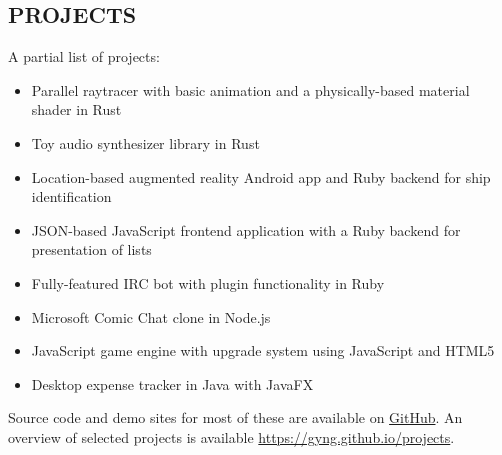 \documentclass[line, margin]{res}
\begin{document}
\begin{resume}
    \section{PROJECTS}
        A partial list of projects: \\
        \begin{itemize}[leftmargin=*]
        \item Parallel raytracer with basic animation and a physically-based material shader in Rust
        \item Toy audio synthesizer library in Rust
        \item Location-based augmented reality Android app and Ruby backend for ship identification
        \item \textsc{JSON}-based JavaScript frontend application with a Ruby backend for presentation of lists
        \item \textsc Fully-featured IRC bot with plugin functionality in Ruby
        \item Microsoft Comic Chat clone in Node.js
        \item JavaScript game engine with upgrade system using JavaScript and HTML5
        \item Desktop expense tracker in Java with JavaFX
        \end{itemize}

        Source code and demo sites for most of these are available on \href{http://github.com/gyng}{GitHub}. An overview of selected projects is available \href{https://gyng.github.io/projects}{https://gyng.github.io/projects}.

\end{resume}
\end{document}
